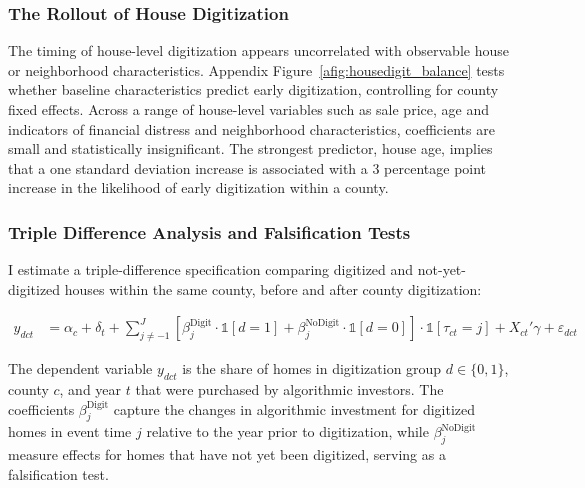 \documentclass[11pt]{article}
\begin{document}
\subsubsection{The Rollout of House Digitization} \label{sec:rollouthouse}
The timing of house-level digitization appears uncorrelated with observable house or neighborhood characteristics. Appendix Figure~\ref{afig:housedigit_balance} tests whether baseline characteristics predict early digitization, controlling for county fixed effects. Across a range of house-level variables such as sale price, age and indicators of financial distress and neighborhood characteristics, coefficients are small and statistically insignificant. The strongest predictor, house age, implies that a one standard deviation increase is associated with a 3 percentage point increase in the likelihood of early digitization within a county.


\subsubsection{Triple Difference Analysis and Falsification Tests}\label{sec:triplediff}
I estimate a triple-difference specification comparing digitized and not-yet-digitized houses within the same county, before and after county digitization:

\begin{align}
y_{dct} 
&= \alpha_c + \delta_t 
+ \sum_{j \ne -1}^{J} \left[ \beta^{\text{Digit}}_j \cdot \mathds{1}[d = 1] + \beta^{\text{NoDigit}}_j \cdot \mathds{1}[d = 0] \right] \cdot \mathds{1}[\tau_{ct} = j] 
+ X_{ct}'\gamma + \varepsilon_{dct}
\label{eq:triple_diff}
\end{align}

The dependent variable \( y_{dct} \) is the share of homes in digitization group \( d \in \{0,1\} \), county \( c \), and year \( t \) that were purchased by algorithmic investors. The coefficients \( \beta^{\text{Digit}}_j \) capture the changes in algorithmic investment for digitized homes in event time \( j \) relative to the year prior to digitization, while \( \beta^{\text{NoDigit}}_j \) measure effects for homes that have not yet been digitized, serving as a falsification test. 
\end{document}
